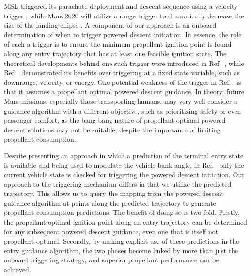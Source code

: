 MSL triggered its parachute deployment and descent sequence using a velocity trigger \cite{MSL_EDL2}, while Mars 2020 will utilize a range trigger \cite{M2020_EDL} to dramatically decrease the size of the landing ellipse \cite{TriggerComparison2020}. A component of our approach is an onboard determination of when to trigger powered descent initiation.  In essence, the role of such a trigger is to ensure the minimum propellant ignition point is found along any entry trajectory that has at least one feasible ignition state. The theoretical developments behind one such trigger were introduced in Ref.~\cite{PropellantOptimalAdaptiveTrigger}, while Ref.~\cite{LuAdaptiveEDL} demonstrated its benefits over triggering at a fixed state variable, such as downrange, velocity, or energy.
One potential weakness of the trigger in Ref.~\cite{PropellantOptimalAdaptiveTrigger} is that it assumes a propellant optimal powered descent guidance. In theory, future Mars missions, especially those transporting humans, may very well consider a guidance algorithm with a different objective, such as prioritizing safety or even passenger comfort, as the bang-bang nature of propellant optimal powered descent solutions may not be suitable, despite the importance of limiting propellant consumption. 

Despite presenting an approach in which a prediction of the terminal entry state is available and being used to modulate the vehicle bank angle, in Ref.~\cite{LuAdaptiveEDL} only the current vehicle state is checked for triggering the powered descent initiation. Our approach to the triggering mechanism differs in that we utilize the predicted trajectory. This allows us to query the mapping from the powered descent guidance algorithm at points along the predicted trajectory to generate propellant consumption predictions.  The benefit of doing so is two-fold. Firstly, the propellant optimal ignition point along an entry trajectory can be determined for any subsequent powered descent guidance, even one that is itself not propellant optimal. Secondly, by making explicit use of these predictions in the entry guidance algorithm, the two phases become linked by more than just the onboard triggering strategy, and superior propellant performance can be achieved. 


